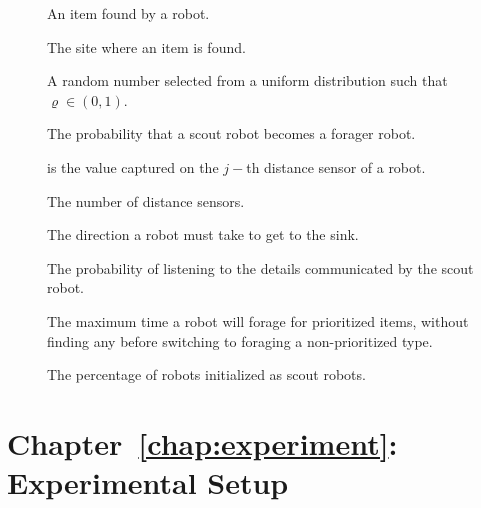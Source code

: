 \begin{description}
	\item[\parbox{\namewidth}{$\vartheta$}] An item found by a robot.
	\item[\parbox{\namewidth}{$\xi$}] The site where an item is found.

	\item[\parbox{\namewidth}{$\varrho$}] A random number selected from a uniform distribution such that $\varrho\in(0,1)$.
	
	\item[\parbox{\namewidth}{$\rho$}] The probability that a scout robot becomes a forager robot.
	
\item[\parbox{\namewidth}{$k_j$}] is the value captured on the $j-$th distance sensor of a robot.

\item[\parbox{\namewidth}{$n$}] The number of distance sensors.

\item[\parbox{\namewidth}{$\sigma$}] The direction a robot must take to get to the sink.

\item[\parbox{\namewidth}{$\alpha$}] The probability of listening to the details communicated by the scout robot.		

\item[\parbox{\namewidth}{$f_{max}$}] The maximum time a robot will forage for prioritized items, without finding any before switching to foraging a non-prioritized type.

\item[\parbox{\namewidth}{$X$}] The percentage of robots initialized as scout robots.
\end{description}


\section{Chapter~\ref{chap:experiment}: Experimental Setup}
\label{sec:symbols:foraging}


